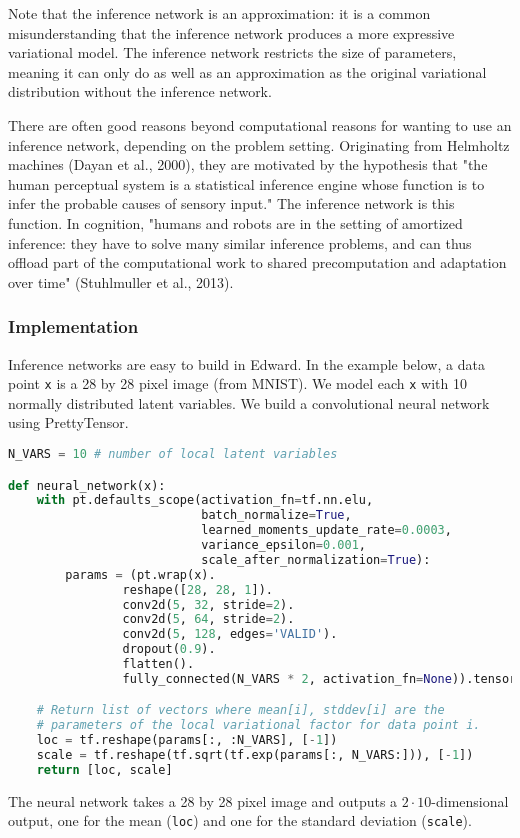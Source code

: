 Note that the inference network is an approximation: it is a common
misunderstanding that the inference network produces a more expressive
variational model. The inference network restricts the size of
parameters, meaning it can only do as well as an approximation as the
original variational distribution without the inference network.

There are often good reasons beyond computational reasons
for wanting to use an inference network, depending on the problem
setting.
Originating from
Helmholtz machines (Dayan et al., 2000), they are motivated by the hypothesis
that "the human perceptual system is a statistical inference engine
whose function is to infer the probable causes of sensory input." The
inference network is this function.
In cognition, "humans and robots are in the setting of amortized
inference: they have to solve many similar inference problems, and can
thus offload part of the computational work to shared precomputation
and adaptation over time" (Stuhlmuller et al., 2013).

\subsubsection{Implementation}

Inference networks are easy to build in Edward.
In the example below, a data point \texttt{x} is a 28 by 28 pixel
image (from MNIST).
We model each \texttt{x} with 10 normally distributed latent
variables.
We build a convolutional neural network using PrettyTensor.
\begin{lstlisting}[language=Python]
N_VARS = 10 # number of local latent variables

def neural_network(x):
    with pt.defaults_scope(activation_fn=tf.nn.elu,
                           batch_normalize=True,
                           learned_moments_update_rate=0.0003,
                           variance_epsilon=0.001,
                           scale_after_normalization=True):
        params = (pt.wrap(x).
                reshape([28, 28, 1]).
                conv2d(5, 32, stride=2).
                conv2d(5, 64, stride=2).
                conv2d(5, 128, edges='VALID').
                dropout(0.9).
                flatten().
                fully_connected(N_VARS * 2, activation_fn=None)).tensor

    # Return list of vectors where mean[i], stddev[i] are the
    # parameters of the local variational factor for data point i.
    loc = tf.reshape(params[:, :N_VARS], [-1])
    scale = tf.reshape(tf.sqrt(tf.exp(params[:, N_VARS:])), [-1])
    return [loc, scale]
\end{lstlisting}
The neural network
takes a 28 by 28 pixel image and outputs a $2\cdot 10$-dimensional
output, one for the mean (\texttt{loc}) and one for the standard
deviation (\texttt{scale}).

